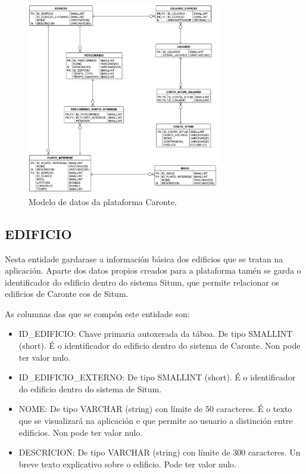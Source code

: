 \begin{figure}[tbh] 
	\begin{center}
		\includegraphics[width=0.75\textwidth]{figures/BD/diagramaEntidadeRelacion}
		\caption{Modelo de datos da plataforma Caronte.}
		\label{fig:modelo_datos}
	\end{center}
\end{figure}

\subsection{EDIFICIO}
Nesta entidade gardarase a información básica dos edificios que se tratan na aplicación. Aparte dos datos propios creados para a plataforma tamén se garda o identificador do edificio dentro do sistema Situm, que permite relacionar os edificios de Caronte cos de Situm.

As columnas das que se compón este entidade son:
\begin{itemize}
	\item ID\_EDIFICIO: Chave primaria autoxerada da táboa. De tipo SMALLINT (short). É o identificador do edificio dentro do sistema de Caronte. Non pode ter valor nulo.
	\item ID\_EDIFICIO\_EXTERNO: De tipo SMALLINT (short). É o identificador do edificio dentro do sistema de Situm.
	\item NOME: De tipo VARCHAR (string) con límite de 50 caracteres. É o texto que se visualizará na aplicación e que permite ao usuario a distinción entre edificios. Non pode ter valor nulo.
	\item DESCRICION: De tipo VARCHAR (string) con límite de 300 caracteres. Un breve texto explicativo sobre o edificio. Pode ter valor nulo.
\end{itemize}

